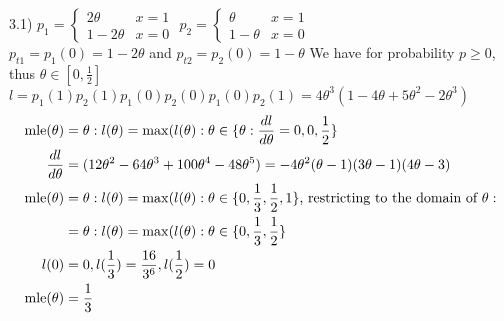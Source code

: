 \documentclass[12pt]{article}
\newcommand{\mle}{\textnormal{mle}}
\newenvironment{problem}[2][Problem]{\begin{trivlist}
\item[\hskip \labelsep {\bfseries #1}\hskip \labelsep {\bfseries #2.}]}{\end{trivlist}}
\begin{document}
\pagebreak
\begin{problem}\label{3.1)}
$p_1 = \begin{cases} 2\theta & x = 1 \\ 1-2\theta & x = 0 \end{cases}$ $p_2 = \begin{cases} \theta & x = 1 \\ 1-\theta & x = 0 \end{cases}$\\
$p_{t1} = p_1(0) = 1-2\theta$ and $p_{t2} = p_2(0) = 1-\theta$
We have for probability $p \geq 0$, thus $\theta \in [0, \frac{1}{2}]$
$l = p_1(1)p_2(1)p_1(0)p_2(0)p_1(0)p_2(1) = 4\theta^3(1-4\theta+5\theta^2-2\theta^3)$\\

\begin{align}
\mle(\theta) &= \theta : l(\theta) = \max(l(\theta) : \theta \in \{\theta : \frac{dl}{d\theta} = 0, 0, \frac{1}{2}\}\\
\frac{dl}{d\theta} &= (12\theta^2 - 64\theta^3+100\theta^4-48\theta^5) = -4\theta^2(\theta-1)(3\theta-1)(4\theta-3)\\
\mle(\theta) &= \theta : l(\theta) = \max(l(\theta) : \theta \in \{0, \frac{1}{3}, \frac{1}{2}, 1\}\textnormal{, restricting to the domain of }\theta:\\
&= \theta : l(\theta) = \max(l(\theta) : \theta \in \{0, \frac{1}{3}, \frac{1}{2}\}\\l(0) &= 0, l(\frac{1}{3}) = \frac{16}{3^6}, l(\frac{1}{2}) = 0\\
\mle(\theta) &= \frac{1}{3}
\end{align}

\end{problem}
\end{document}
